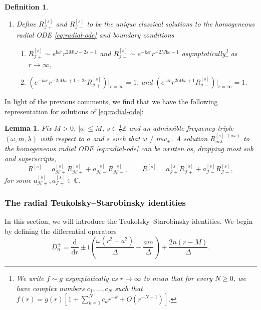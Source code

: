 \documentclass[11pt]{article}
\newtheorem{lemma}[proposition]{Lemma}
\newtheorem{definition}[proposition]{Definition}
\newcommand{\dd}{\mathrm{d}}
\newcommand{\ii}{\mathrm{i}}
\newcommand{\cH}{\mathcal H}
\newcommand{\cI}{\mathcal I}
\numberwithin{equation}{section}
\begin{document}
\begin{definition}
\begin{enumerate}[label=\arabic*.]
\begin{enumerate}[label=(\alph*)]
\end{enumerate}
\item Define $R^{[s]}_{\cI+}$ and $R^{[s]}_{\cI-}$ to be the unique classical solutions to the homogeneous radial ODE \eqref{eq:radial-ode} and boundary conditions
\begin{enumerate}[label=(\alph*)]
\item $R^{[s]}_{\cI+}\sim e^{\ii\omega r}r^{2M\ii\omega-2s-1}$ and $R^{[s]}_{\cI-}\sim e^{-\ii\omega r}r^{-2M\ii\omega-1}$ asymptotically\footnote{We write $f\sim g$ asymptotically as $r\to\infty$ to mean that for every $N\geq 0$, we have complex numbers $c_1, \dots, c_N$ such that $f(r)=g(r)\left[1+\sum_{k=1}^N c_k r^{-k}+O(r^{-N-1})\right]$.} as $r\to\infty$,
\item $\left(e^{-\ii\omega r}r^{-2\ii M\omega+1+2s}R^{[s]}_{\cI+}\right)\big|_{r=\infty}=1$, and $\left(e^{\ii\omega r}r^{2\ii M\omega+1}R^{[s]}_{\cI-}\right)\big|_{r=\infty}=1$.
\end{enumerate}
\end{enumerate}
\end{definition}

In light of the previous comments, we find that we have the following representation for solutions of \eqref{eq:radial-ode}:

\begin{lemma}\label{lem:radial-representation}
Fix $M>0$, $|a|\leq M$, $s\in \frac12\mathbb Z$ and an admissible frequency triple $(\omega,m,\lambda)$ with respect to $a$ and $s$ such that $\omega\neq m\omega_+$. A solution $R^{[s],(a\omega)}_{m\lambda}$ to the homogeneous radial ODE \eqref{eq:radial-ode} can be written as, dropping most sub and superscripts,
\begin{equation}\label{eq:radial-representation}
        R^{[s]}=a^{[s]}_{\cH+}R^{[s]}_{\cH+}+a^{[s]}_{\cH-}R^{[s]}_{\cH-},
        \qquad
        R^{[s]}=a^{[s]}_{\cI+}R^{[s]}_{\cI+}+a^{[s]}_{\cI-}R^{[s]}_{\cI-},
\end{equation}
for some $a^{[s]}_{\cH\pm},a^{[s]}_{\cI\pm}\in\mathbb C$.
\end{lemma}

\subsubsection{The radial Teukolsky--Starobinsky identities}

In this section, we will introduce the Teukolsky--Starobinsky identities. We begin by defining the differential operators
\begin{equation}\label{eq:Dpm}
        D^{\pm}_n=\frac{\dd}{\dd r}\pm\ii\left(\frac{\omega(r^2+a^2)}{\Delta}-\frac{am}{\Delta}\right)+\frac{2n(r-M)}{\Delta}.
\end{equation}
\end{document}
